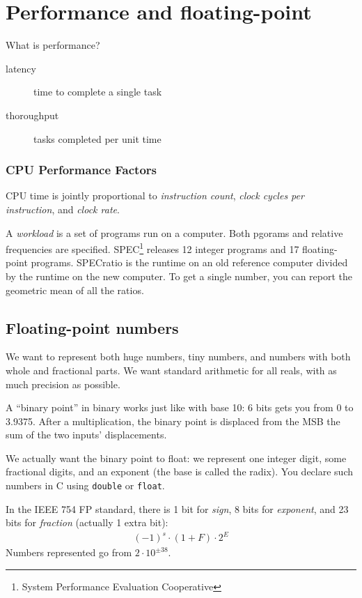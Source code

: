 \chapter{Performance and floating-point}
What is performance?
\begin{description}
	\item[latency] time to complete a single task
	\item[thoroughput] tasks completed per unit time
\end{description}

\subsection{CPU Performance Factors}
CPU time is jointly proportional to \emph{instruction count}, \emph{clock cycles per instruction}, and \emph{clock rate}.

A \emph{workload} is a set of programs run on a computer. Both pgorams and relative frequencies are specified. SPEC\footnote{System Performance Evaluation Cooperative} releases 12 integer programs and 17 floating-point programs. SPECratio is the runtime on an old reference computer divided by the runtime on the new computer. To get a single number, you can report the geometric mean of all the ratios.

\section{Floating-point numbers}
We want to represent both huge numbers, tiny numbers, and numbers with both whole and fractional parts.
We want standard arithmetic for all reals, with as much precision as possible.

A ``binary point'' in binary works just like with base 10: 6 bits gets you from 0 to 3.9375. After a multiplication, the binary point is displaced from the MSB the sum of the two inputs' displacements.

We actually want the binary point to float: we represent one integer digit, some fractional digits, and an exponent (the base is called the radix). You declare such numbers in C using \texttt{double} or \texttt{float}.

In the IEEE 754 FP standard, there is 1 bit for \emph{sign}, 8 bits for \emph{exponent}, and 23 bits for \emph{fraction} (actually 1 extra bit):
\begin{align}
\left(-1\right)^s \cdot (1 + F) \cdot 2^E
\end{align}
Numbers represented go from \(2\cdot10^{\pm38}\).

